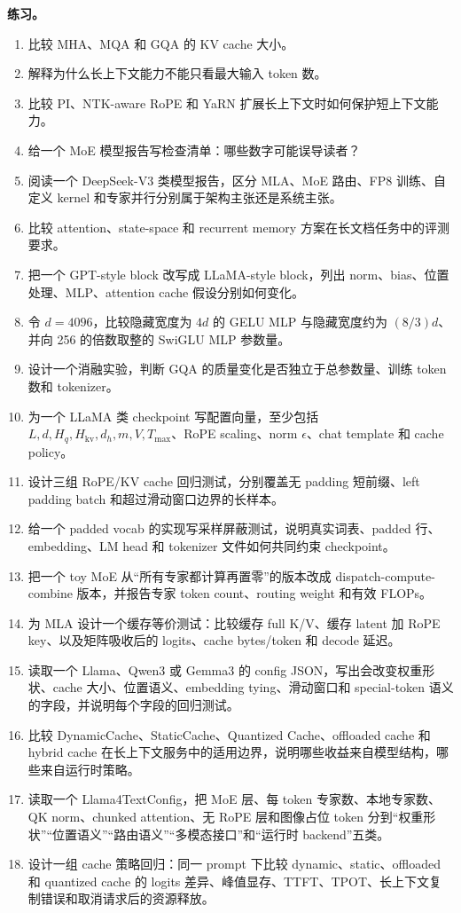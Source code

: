 \documentclass[UTF8,zihao=-4,openany]{ctexbook}
\begin{document}
\textbf{练习。}
\begin{enumerate}
\item 比较 MHA、MQA 和 GQA 的 KV cache 大小。
\item 解释为什么长上下文能力不能只看最大输入 token 数。
\item 比较 PI、NTK-aware RoPE 和 YaRN 扩展长上下文时如何保护短上下文能力。
\item 给一个 MoE 模型报告写检查清单：哪些数字可能误导读者？
\item 阅读一个 DeepSeek-V3 类模型报告，区分 MLA、MoE 路由、FP8 训练、自定义 kernel 和专家并行分别属于架构主张还是系统主张。
\item 比较 attention、state-space 和 recurrent memory 方案在长文档任务中的评测要求。
\item 把一个 GPT-style block 改写成 LLaMA-style block，列出 norm、bias、位置处理、MLP、attention cache 假设分别如何变化。
\item 令 $d=4096$，比较隐藏宽度为 $4d$ 的 GELU MLP 与隐藏宽度约为 $(8/3)d$、并向 256 的倍数取整的 SwiGLU MLP 参数量。
\item 设计一个消融实验，判断 GQA 的质量变化是否独立于总参数量、训练 token 数和 tokenizer。
\item 为一个 LLaMA 类 checkpoint 写配置向量，至少包括 $L,d,H_q,H_{\mathrm{kv}},d_h,m,V,T_{\max}$、RoPE scaling、norm $\epsilon$、chat template 和 cache policy。
\item 设计三组 RoPE/KV cache 回归测试，分别覆盖无 padding 短前缀、left padding batch 和超过滑动窗口边界的长样本。
\item 给一个 padded vocab 的实现写采样屏蔽测试，说明真实词表、padded 行、embedding、LM head 和 tokenizer 文件如何共同约束 checkpoint。
\item 把一个 toy MoE 从“所有专家都计算再置零”的版本改成 dispatch-compute-combine 版本，并报告专家 token count、routing weight 和有效 FLOPs。
\item 为 MLA 设计一个缓存等价测试：比较缓存 full K/V、缓存 latent 加 RoPE key、以及矩阵吸收后的 logits、cache bytes/token 和 decode 延迟。
\item 读取一个 Llama、Qwen3 或 Gemma3 的 config JSON，写出会改变权重形状、cache 大小、位置语义、embedding tying、滑动窗口和 special-token 语义的字段，并说明每个字段的回归测试。
\item 比较 DynamicCache、StaticCache、Quantized Cache、offloaded cache 和 hybrid cache 在长上下文服务中的适用边界，说明哪些收益来自模型结构，哪些来自运行时策略。
\item 读取一个 Llama4TextConfig，把 MoE 层、每 token 专家数、本地专家数、QK norm、chunked attention、无 RoPE 层和图像占位 token 分到“权重形状”“位置语义”“路由语义”“多模态接口”和“运行时 backend”五类。
\item 设计一组 cache 策略回归：同一 prompt 下比较 dynamic、static、offloaded 和 quantized cache 的 logits 差异、峰值显存、TTFT、TPOT、长上下文复制错误和取消请求后的资源释放。
\end{enumerate}
\end{document}
